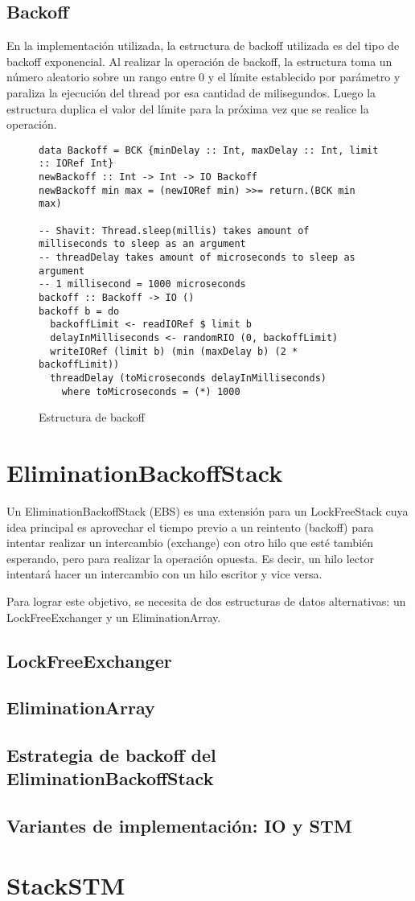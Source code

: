 \subsection{Backoff}
En la implementación utilizada, la estructura de backoff utilizada es del tipo de backoff exponencial. Al realizar la operación de backoff, la estructura toma un número aleatorio sobre un rango entre 0 y el límite establecido por parámetro y paraliza la ejecución del thread por esa cantidad de milisegundos. Luego la estructura duplica el valor del límite para la próxima vez que se realice la operación.
\begin{figure}[h]
\begin{verbatim}
data Backoff = BCK {minDelay :: Int, maxDelay :: Int, limit :: IORef Int}
newBackoff :: Int -> Int -> IO Backoff
newBackoff min max = (newIORef min) >>= return.(BCK min max)

-- Shavit: Thread.sleep(millis) takes amount of milliseconds to sleep as an argument
-- threadDelay takes amount of microseconds to sleep as argument
-- 1 millisecond = 1000 microseconds
backoff :: Backoff -> IO ()
backoff b = do
  backoffLimit <- readIORef $ limit b
  delayInMilliseconds <- randomRIO (0, backoffLimit)
  writeIORef (limit b) (min (maxDelay b) (2 * backoffLimit))
  threadDelay (toMicroseconds delayInMilliseconds)
    where toMicroseconds = (*) 1000
\end{verbatim}
\caption{Estructura de backoff}
\end{figure}

\clearpage
\section{EliminationBackoffStack}

Un EliminationBackoffStack (EBS) es una extensión para un LockFreeStack cuya idea principal es aprovechar el tiempo previo a un reintento (backoff) para intentar realizar un intercambio (exchange) con otro hilo que esté también esperando, pero para realizar la operación opuesta. Es decir, un hilo lector intentará hacer un intercambio con un hilo escritor y vice versa.

Para lograr este objetivo, se necesita de dos estructuras de datos alternativas: un LockFreeExchanger y un EliminationArray.


\subsection{LockFreeExchanger}
\subsection{EliminationArray}
\subsection{Estrategia de backoff del EliminationBackoffStack}
\subsection{Variantes de implementación: IO y STM}

\clearpage
\section{StackSTM}